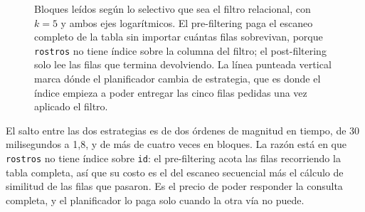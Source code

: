 \begin{figure}[H]
\centering
{}
\caption{Bloques leídos según lo selectivo que sea el filtro relacional, con
$k = 5$ y ambos ejes logarítmicos. El pre-filtering paga el escaneo completo de
la tabla sin importar cuántas filas sobrevivan, porque \texttt{rostros} no tiene
índice sobre la columna del filtro; el post-filtering solo lee las filas que
termina devolviendo. La línea punteada vertical marca dónde el planificador
cambia de estrategia, que es donde el índice empieza a poder entregar las cinco
filas pedidas una vez aplicado el filtro.}
\label{fig:e9-estrategia}
\end{figure}

El salto entre las dos estrategias es de dos órdenes de magnitud en tiempo, de
30 milisegundos a 1{,}8, y de más de cuatro veces en bloques. La razón está en
que \texttt{rostros} no tiene índice sobre \texttt{id}: el pre-filtering acota
las filas recorriendo la tabla completa, así que su costo es el del escaneo
secuencial más el cálculo de similitud de las filas que pasaron. Es el precio de
poder responder la consulta completa, y el planificador lo paga solo cuando la
otra vía no puede.


